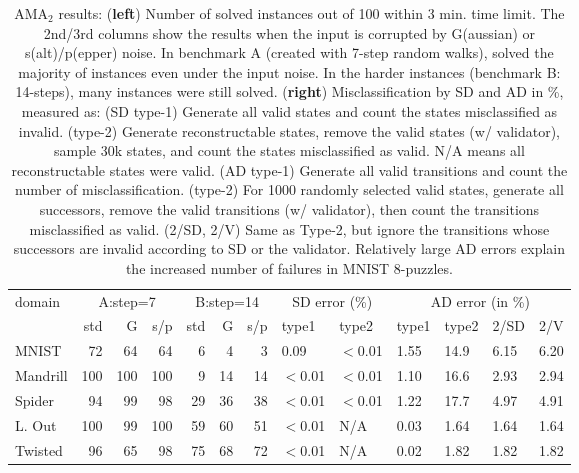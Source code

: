 \documentclass[11pt]{article}
\begin{document}
\begin{table}[tbp]
\centering
\begin{tabular}{|l|r|r|r|r|r|r||l|l|l|l|l|l|}
\hline
domain   & \multicolumn{3}{c|}{A:step=7}& \multicolumn{3}{c||}{B:step=14} &  \multicolumn{2}{c|}{SD error (\%)} &  \multicolumn{4}{c|}{AD error (in \%)} \\
                     & std & G   & s/p & std & G & s/p & type1   & type2   & type1  & type2  & 2/SD & 2/V  \\ \hline
MNIST                & 72  & 64  & 64  &6    &4  &3    & 0.09    & $<$0.01 & 1.55   & 14.9   & 6.15 & 6.20 \\ 
Mandrill             & 100 & 100 & 100 &9    &14 &14   & $<$0.01 & $<$0.01 & 1.10   & 16.6   & 2.93 & 2.94 \\ 
Spider               & 94  & 99  & 98  &29   &36 &38   & $<$0.01 & $<$0.01 & 1.22   & 17.7   & 4.97 & 4.91 \\ 
L. Out               & 100 & 99  & 100 &59   &60 &51   & $<$0.01 & N/A     & 0.03   & 1.64   & 1.64 & 1.64 \\
Twisted              & 96  & 65  & 98  &75   &68 &72   & $<$0.01 & N/A     & 0.02   & 1.82   & 1.82 & 1.82 \\
\hline
\end{tabular}
\caption{
AMA$_2$ results: (\textbf{left}) Number of solved instances out of 100 within 3 min. time limit.
The 2nd/3rd columns show the results when the input is corrupted by G(aussian) or s(alt)/p(epper) noise.
In benchmark A (created with 7-step random walks),
\latentplanner solved the majority of instances even under the input noise.
In the harder instances (benchmark B: 14-steps),
many instances were still solved. 
(\textbf{right}) Misclassification by SD and AD in \%, measured as:
(SD type-1) Generate all valid states and count the states misclassified as invalid.
(type-2) Generate reconstructable states, remove the valid states (w/ validator),
sample 30k states, and count the states misclassified as valid.
N/A means all reconstructable states were valid.
(AD type-1) Generate all valid transitions and count the number of misclassification.
(type-2) For 1000 randomly selected valid states, generate all successors, remove the valid transitions (w/ validator), then count the transitions misclassified as valid.
(2/SD, 2/V) Same as Type-2, but ignore the transitions whose successors are invalid according to SD or the validator.
Relatively large AD errors explain the increased number of failures in MNIST 8-puzzles.
}
\label{tab:aae-results}
\end{table}
\end{document}
